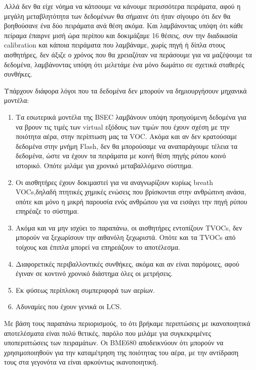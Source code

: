 Αλλά δεν θα είχε νόημα να κάτσουμε να κάνουμε περισσότερα πειράματα, αφού η μεγάλη μεταβλητότητα των δεδομένων θα σήμαινε ότι ήταν σίγουρο ότι δεν θα βοηθούσανε
ένα δύο πειράματα ανά θέση ακόμα.
Και λαμβάνοντας υπόψη ότι κάθε πείραμα έπαιρνε μισή ώρα περίπου και δοκιμάζαμε 16 θέσεις, συν την διαδικασία calibration και κάποια πειράματα που λαμβάναμε,
χωρίς πηγή ή δίπλα στους αισθητήρες, δεν άξιζε ο χρόνος που θα χρειαζόταν να περάσουμε για να μαζέψουμε τα δεδομένα, λαμβάνοντας υπόψη ότι μελετάμε ένα μόνο δωμάτιο σε σχετικά σταθερές συνθήκες.

Υπάρχουν διάφορα λόγοι που τα δεδομένα δεν μπορούν να δημιουργήσουν μηχανικά μοντέλα:

\begin{enumerate}
    \item Τα εσωτερικά μοντέλα της BSEC λαμβάνουν υπόψη προηγούμενη δεδομένα για να βρουν τις τιμές των virtual εξόδους των τιμών που έχουν σχέση με την ποιότητα αέρα, στην περίπτωση μας τα VOC.
    Ακόμα και αν δεν κρατούσαμε δεδομένα στην μνήμη Flash, δεν θα μπορούσαμε να αναπαράγουμε τέλεια τα δεδομένα, ώστε να έχουν τα πειράματα με κοινή θέση πηγής ρύπου κοινό ιστορικό.
    Οπότε μιλάμε για χρονικό μεταβαλλόμενο σύστημα.
    \item Οι αισθητήρες έχουν δοκιμαστεί για να αναγνωρίζουν κυρίως breath VOCs,δηλαδή πτητικές χημικές ενώσεις που βρίσκονται στην ανθρώπινη ανάσα, οπότε και μόνο η μικρή παρουσία ενός ανθρώπου για να εισάγει την πηγή ρύπου επηρέαζε το σύστημα.
    \item Ακόμα και να μην ισχύει το παραπάνω, οι αισθητήρες εντοπίζουν TVOCs, δεν μπορούν να ξεχωρίσουν την αιθανόλη ξεχωριστά. Οπότε και τα TVOCs από τοίχους και έπιπλα μπορεί να επηρεάζουν το αποτέλεσμα.
    \item Διαφορετικές περιβαλλοντικές συνθήκες, ακόμα και αν είναι παρόμοιες, αφού έγιναν σε κοντινό χρονικό διάστημα όλες οι μετρήσεις.
    \item Εκ φύσεως περίπλοκη συμπεριφορά των αερίων.
    \item Αδυναμίες που έχουν γενικά οι LCS.
\end{enumerate}

Με βάση τους παραπάνω περιορισμούς, το ότι βρήκαμε περιπτώσεις με ικανοποιητικά αποτελέσματα είναι πολύ θετικές, παρόλο που μιλάμε για συγκεκριμένες υποπεριπτώσεις των πειραμάτων.
Οι BME680 αποδεικνύουν ότι μπορούν να χρησιμοποιηθούν για την καταμέτρηση της ποιότητας του αέρα, με την αντίδραση τους στα γεγονότα να είναι αρκούντως ικανοποιητική.

